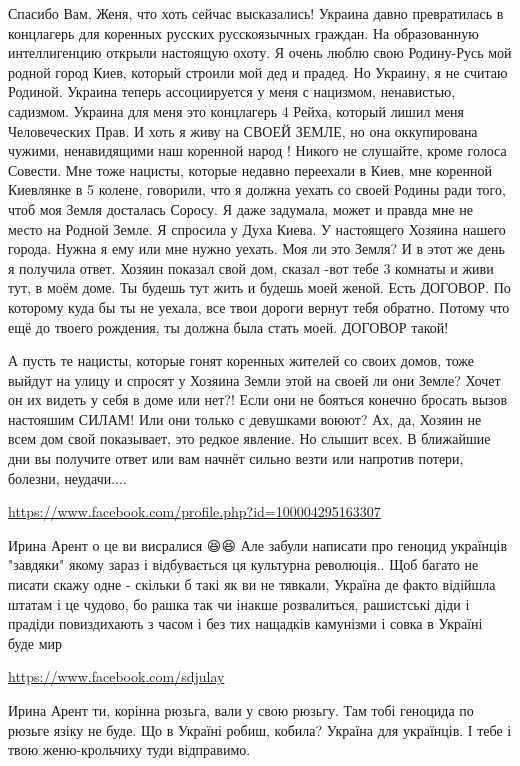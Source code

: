 \documentclass[a4paper,11pt]{extreport}
\begin{document}
\begin{itemize}
Спасибо Вам, Женя, что хоть сейчас высказались! Украина давно превратилась в концлагерь для коренных русских русскоязычных граждан. На образованную интеллигенцию открыли настоящую охоту. Я очень люблю свою Родину-Русь мой родной город Киев, который строили мой дед и прадед. Но Украину, я не считаю Родиной. Украина теперь ассоциируется у меня с нацизмом, ненавистью, садизмом. Украина для меня это концлагерь 4 Рейха, который лишил меня Человеческих Прав. И хоть я живу на СВОЕЙ ЗЕМЛЕ, но она оккупирована чужими, ненавидящими наш коренной народ ! Никого не слушайте, кроме голоса Совести. Мне тоже нацисты, которые недавно переехали в Киев, мне коренной Киевлянке в 5 колене, говорили, что я должна уехать со своей Родины ради того, чтоб моя Земля досталась Соросу. Я даже задумала, может и правда мне не место на Родной Земле. Я спросила у Духа Киева. У настоящего Хозяина нашего города. Нужна я ему или мне нужно уехать. Моя ли это Земля? И в этот же день я получила ответ. Хозяин показал свой дом, сказал -вот тебе 3 комнаты и живи тут, в моём доме. Ты будешь тут жить и будешь моей женой. Есть ДОГОВОР. По которому куда бы ты не уехала, все твои дороги вернут тебя обратно. Потому что ещё до твоего рождения, ты должна была стать моей. ДОГОВОР такой!

А пусть те нацисты, которые гонят коренных жителей со своих домов, тоже выйдут на улицу и спросят у Хозяина Земли этой на своей ли они Земле? Хочет он их видеть у себя в доме или нет?! Если они не бояться конечно бросать вызов настояшим СИЛАМ! Или они только с девушками воюют? Ах, да, Хозяин не всем дом свой показывает, это редкое явление. Но слышит всех. В ближайшие дни вы получите ответ или вам начнёт сильно везти или напротив потери, болезни, неудачи....

\begin{itemize}
\url{https://www.facebook.com/profile.php?id=100004295163307}

Ирина Арент о це ви висралися 😆😆
Але забули написати про геноцид українців "завдяки" якому зараз і відбувається ця культурна революція..
Щоб багато не писати скажу одне - скільки б такі як ви не тявкали, Україна де факто відійшла штатам і це чудово, бо рашка так чи інакше розвалиться, рашистські діди і прадіди повиздихають з часом і без тих нащадків камунізми і совка в Україні буде мир

\url{https://www.facebook.com/sdjulay}

Ирина Арент ти, корінна рюзьга, вали у свою рюзьгу. Там тобі геноцида по рюзьге язіку не буде. Що в Україні робиш, кобила? Україна для українців. І тебе і твою женю-крольчиху туди відправимо.


\end{itemize}
\end{itemize}
\end{document}
